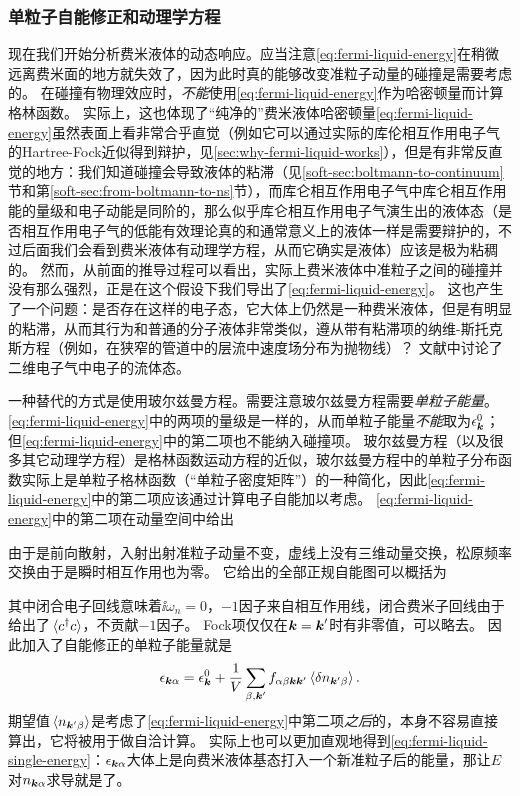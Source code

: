 \subsubsection{单粒子自能修正和动理学方程}

现在我们开始分析费米液体的动态响应。应当注意\eqref{eq:fermi-liquid-energy}在稍微远离费米面的地方就失效了，因为此时真的能够改变准粒子动量的碰撞是需要考虑的。
在碰撞有物理效应时，\emph{不能}使用\eqref{eq:fermi-liquid-energy}作为哈密顿量而计算格林函数。
实际上，这也体现了“纯净的”费米液体哈密顿量\eqref{eq:fermi-liquid-energy}虽然表面上看非常合乎直觉（例如它可以通过实际的库伦相互作用电子气的Hartree-Fock近似得到辩护，见\autoref{sec:why-fermi-liquid-works}），但是有非常反直觉的地方：我们知道碰撞会导致液体的粘滞（见\ref{soft-sec:boltmann-to-continuum}节和第\ref{soft-sec:from-boltmann-to-ns}节），而库仑相互作用电子气中库仑相互作用能的量级和电子动能是同阶的，那么似乎库仑相互作用电子气演生出的液体态（是否相互作用电子气的低能有效理论真的和通常意义上的液体一样是需要辩护的，不过后面我们会看到费米液体有动理学方程，从而它确实是液体）应该是极为粘稠的。
然而，从前面的推导过程可以看出，实际上费米液体中准粒子之间的碰撞并没有那么强烈，正是在这个假设下我们导出了\eqref{eq:fermi-liquid-energy}。
这也产生了一个问题：是否存在这样的电子态，它大体上仍然是一种费米液体，但是有明显的粘滞，从而其行为和普通的分子液体非常类似，遵从带有粘滞项的纳维-斯托克斯方程（例如，在狭窄的管道中的层流中速度场分布为抛物线）？
文献\cite{Chandra_2019}中讨论了二维电子气中电子的流体态。

一种替代的方式是使用玻尔兹曼方程。需要注意玻尔兹曼方程需要\emph{单粒子能量}。\eqref{eq:fermi-liquid-energy}中的两项的量级是一样的，从而单粒子能量\emph{不能}取为$\epsilon_{\vb*{k}}^0$；但\eqref{eq:fermi-liquid-energy}中的第二项也不能纳入碰撞项。
玻尔兹曼方程（以及很多其它动理学方程）是格林函数运动方程的近似，玻尔兹曼方程中的单粒子分布函数实际上是单粒子格林函数（“单粒子密度矩阵”）的一种简化，因此\eqref{eq:fermi-liquid-energy}中的第二项应该通过计算电子自能加以考虑。
\eqref{eq:fermi-liquid-energy}中的第二项在动量空间中给出

由于是前向散射，入射出射准粒子动量不变，虚线上没有三维动量交换，松原频率交换由于是瞬时相互作用也为零。
它给出的全部正规自能图可以概括为

其中闭合电子回线意味着$\ii \omega_n = 0$，$-1$因子来自相互作用线，闭合费米子回线由于给出了$\expval*{c^\dagger c}$，不贡献$-1$因子。
Fock项仅仅在$\vb*{k} = \vb*{k}'$时有非零值，可以略去。
因此加入了自能修正的单粒子能量就是
\begin{equation}
    \epsilon_{\vb*{k} \alpha} = \epsilon_{\vb*{k}}^0 + \frac{1}{V} \sum_{\beta, \vb*{k}'} f_{\alpha \beta \vb*{k} \vb*{k}'} \expval*{\var{n_{\vb*{k}' \beta}}}.
    \label{eq:fermi-liquid-single-energy}
\end{equation}
期望值$\expval*{n_{\vb*{k}' \beta}}$是考虑了\eqref{eq:fermi-liquid-energy}中第二项\emph{之后}的，本身不容易直接算出，它将被用于做自洽计算。
实际上也可以更加直观地得到\eqref{eq:fermi-liquid-single-energy}：$\epsilon_{\vb*{k} \alpha}$大体上是向费米液体基态打入一个新准粒子后的能量，那让$E$对$n_{\vb*{k} \alpha}$求导就是了。

